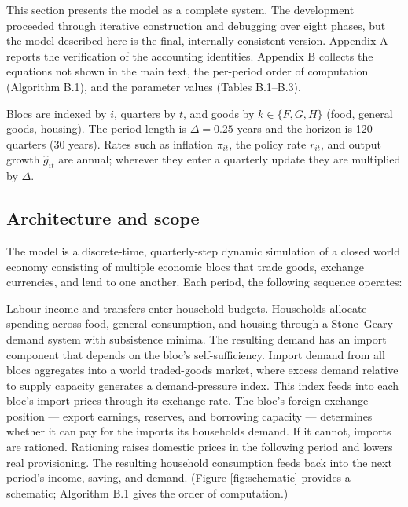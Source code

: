 \documentclass[preprint,review,12pt]{elsarticle}
\begin{document}
This section presents the model as a complete system. The development
proceeded through iterative construction and debugging over eight
phases, but the model described here is the final, internally consistent
version. Appendix A reports the verification of the accounting
identities. Appendix B collects the equations not shown in the main text, the
per-period order of computation (Algorithm B.1), and the parameter
values (Tables B.1--B.3).

Blocs are indexed by \(i\), quarters by \(t\), and goods by
\(k \in \{F, G, H\}\) (food, general goods, housing). The period length
is \(\Delta = 0.25\) years and the horizon is 120 quarters (30 years).
Rates such as inflation \(\pi_{it}\), the policy rate \(r_{it}\), and
output growth \(\hat{g}_{it}\) are annual; wherever they enter a
quarterly update they are multiplied by \(\Delta\).

\subsection{Architecture and scope}

The model is a discrete-time, quarterly-step dynamic simulation of a
closed world economy consisting of multiple economic blocs that trade
goods, exchange currencies, and lend to one another. Each period, the
following sequence operates:

Labour income and transfers enter household budgets. Households allocate
spending across food, general consumption, and housing through a
Stone--Geary demand system with subsistence minima. The resulting demand
has an import component that depends on the bloc's self-sufficiency.
Import demand from all blocs aggregates into a world traded-goods
market, where excess demand relative to supply capacity generates a
demand-pressure index. This index feeds into each bloc's import prices
through its exchange rate. The bloc's foreign-exchange position ---
export earnings, reserves, and borrowing capacity --- determines whether
it can pay for the imports its households demand. If it cannot, imports
are rationed. Rationing raises domestic prices in the following period
and lowers real provisioning. The resulting household consumption feeds
back into the next period's income, saving, and demand. (Figure
\ref{fig:schematic} provides a schematic; Algorithm B.1 gives the order
of computation.)
\end{document}
